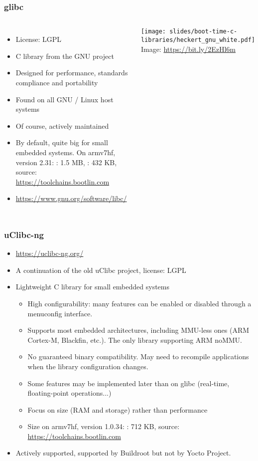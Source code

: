 \begin{frame}
  \frametitle{glibc}
  \begin{columns}
    \begin{itemize}
    \item License: LGPL
    \item C library from the GNU project
    \item Designed for performance, standards compliance and portability
    \item Found on all GNU / Linux host systems
    \item Of course, actively maintained
    \item By default, quite big for small embedded systems.
      On armv7hf, version 2.31: : 1.5 MB, : 432
      KB, source: \url{https://toolchains.bootlin.com}
    \item \url{https://www.gnu.org/software/libc/}
    \end{itemize}
    \vfill
    \minipage[c][0.8\textheight][s]{\columnwidth}
    \texttt{[image: slides/boot-time-c-libraries/heckert\_gnu\_white.pdf]}
    \vfill
    \tiny Image: \url{https://bit.ly/2EzHl6m}
    \endminipage
  \end{columns}
\end{frame}

\begin{frame}
  \frametitle{uClibc-ng}
  \begin{itemize}
  \item \url{https://uclibc-ng.org/}
  \item A continuation of the old uClibc project, license: LGPL
  \item Lightweight C library for small embedded systems
    \begin{itemize}
    \item High configurability: many features can be enabled or
      disabled through a menuconfig interface.
    \item Supports most embedded architectures, including MMU-less
          ones (ARM Cortex-M, Blackfin, etc.). The only library
          supporting ARM noMMU.
    \item No guaranteed binary compatibility. May need to
      recompile applications when the library configuration changes.
    \item Some features may be implemented later than on glibc (real-time,
          floating-point operations...)
    \item Focus on size (RAM and storage) rather than performance
    \item Size on armv7hf, version 1.0.34:
      : 712 KB, source: \url{https://toolchains.bootlin.com}
    \end{itemize}
    \item Actively supported, supported by Buildroot but not by Yocto Project.
  \end{itemize}
\end{frame}

